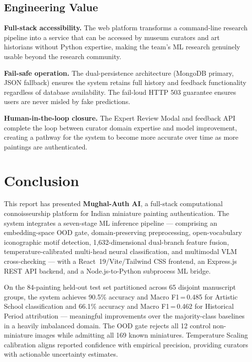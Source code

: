 \documentclass[12pt, a4paper, twoside]{article}
\begin{document}
\subsection{Engineering Value}

\textbf{Full-stack accessibility.} The web platform transforms a command-line research pipeline into a service that can be accessed by museum curators and art historians without Python expertise, making the team's ML research genuinely usable beyond the research community.

\textbf{Fail-safe operation.} The dual-persistence architecture (MongoDB primary, JSON fallback) ensures the system retains full history and feedback functionality regardless of database availability. The fail-loud HTTP 503 guarantee ensures users are never misled by fake predictions.

\textbf{Human-in-the-loop closure.} The Expert Review Modal and feedback API complete the loop between curator domain expertise and model improvement, creating a pathway for the system to become more accurate over time as more paintings are authenticated.

\section{Conclusion}
\label{sec:conclusion}

This report has presented \textbf{Mughal-Auth AI}, a full-stack computational connoisseurship platform for Indian miniature painting authentication. The system integrates a seven-stage ML inference pipeline — comprising an embedding-space OOD gate, domain-preserving preprocessing, open-vocabulary iconographic motif detection, 1,632-dimensional dual-branch feature fusion, temperature-calibrated multi-head neural classification, and multimodal VLM cross-checking — with a React~19/Vite/Tailwind CSS frontend, an Express.js REST API backend, and a Node.js-to-Python subprocess ML bridge.

On the 84-painting held-out test set partitioned across 65 disjoint manuscript groups, the system achieves 90.5\% accuracy and Macro F1\,=\,0.485 for Artistic School classification and 66.1\% accuracy and Macro F1\,=\,0.462 for Historical Period attribution — meaningful improvements over the majority-class baselines in a heavily imbalanced domain. The OOD gate rejects all 12 control non-miniature images while admitting all 169 known miniatures. Temperature Scaling calibration aligns reported confidence with empirical precision, providing curators with actionable uncertainty estimates.
\end{document}
